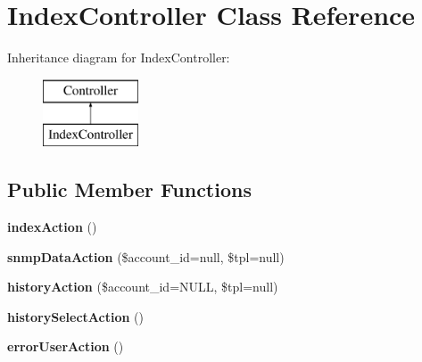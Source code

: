 \hypertarget{class_index_controller}{\section{Index\-Controller Class Reference}
\label{class_index_controller}
}
Inheritance diagram for Index\-Controller\-:\begin{figure}[H]
\begin{center}
\leavevmode
\includegraphics[height=2.000000cm]{class_index_controller}
\end{center}
\end{figure}
\subsection*{Public Member Functions}
\begin{DoxyCompactItemize}
\item 
\hypertarget{class_index_controller_a04f2101fe1cdc785b61219c2df753024}{{\bfseries index\-Action} ()}\label{class_index_controller_a04f2101fe1cdc785b61219c2df753024}

\item 
\hypertarget{class_index_controller_aa6095cbe57e0f33ed2817e90fb9c15b5}{{\bfseries snmp\-Data\-Action} (\$account\-\_\-id=null, \$tpl=null)}\label{class_index_controller_aa6095cbe57e0f33ed2817e90fb9c15b5}

\item 
\hypertarget{class_index_controller_a78f0f6573202e47da201da8ec65b47e6}{{\bfseries history\-Action} (\$account\-\_\-id=N\-U\-L\-L, \$tpl=null)}\label{class_index_controller_a78f0f6573202e47da201da8ec65b47e6}

\item 
\hypertarget{class_index_controller_a08d981933bfad63d4079e102a6c8c62e}{{\bfseries history\-Select\-Action} ()}\label{class_index_controller_a08d981933bfad63d4079e102a6c8c62e}

\item 
\hypertarget{class_index_controller_aeb878b884fc09ac18de62804e948e975}{{\bfseries error\-User\-Action} ()}\label{class_index_controller_aeb878b884fc09ac18de62804e948e975}

\end{DoxyCompactItemize}
